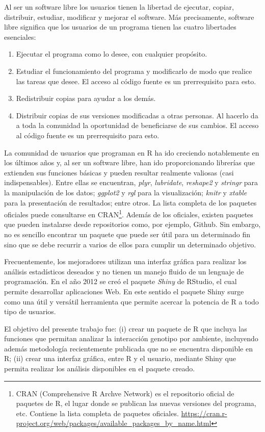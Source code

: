 Al ser un software libre los usuarios tienen la libertad de ejecutar, copiar, distribuir, estudiar, modificar y mejorar el software. Más precisamente, software libre significa que los usuarios de un programa tienen las cuatro libertades esenciales:
\begin{enumerate}
\item Ejecutar el programa como lo desee, con cualquier propósito.
\item Estudiar el funcionamiento del programa y modificarlo de modo que realice las tareas que desee. El acceso al código fuente es un prerrequisito para esto.
\item Redistribuir copias para ayudar a los demás.
\item Distribuir copias de sus versiones modificadas a otras personas. Al hacerlo da a toda la comunidad la oportunidad de beneficiarse de sus cambios. El acceso al código fuente es un prerrequisito para esto.
\end{enumerate}

La comunidad de usuarios que programan en R ha ido creciendo notablemente en los últimos años y, al ser un software libre, han ido proporcionando librerías que extienden sus funciones básicas y pueden resultar realmente valiosas (casi indispensables). Entre ellas se encuentran, \emph{plyr}, \emph{lubridate}, \emph{reshape2} y \emph{stringr} para la manipulación de los datos; \emph{ggplot2} y \emph{rgl} para la visualización; \emph{knitr} y \emph{xtable} para la presentación de resultados; entre otros. La lista completa de los paquetes oficiales puede consultarse en CRAN\footnote{CRAN (Comprehensive R Archve Network) es el repositorio oficial de paquetes de R, el lugar donde se publican las nuevas versiones del programa, etc. Contiene la lista completa de paquetes oficiales. \url{https://cran.r-project.org/web/packages/available_packages_by_name.html}}. Además de los oficiales, existen paquetes que pueden instalarse desde repositorios como, por ejemplo, Github. Sin embargo, no es sencillo encontrar un paquete que puede ser útil para un determinado fin sino que se debe recurrir a varios de ellos para cumplir un determinado objetivo. 

Frecuentemente, los mejoradores utilizan una interfaz gráfica para realizar los análisis estadísticos deseados y no tienen un manejo fluido de un lenguaje de programación. En el año 2012 se creó el paquete \emph{Shiny} de RStudio, el cual permite desarrollar aplicaciones Web. En este sentido el paquete Shiny surge como una útil y versátil herramienta que permite acercar la potencia de R a todo tipo de usuarios.

El objetivo del presente trabajo fue: (i) crear un paquete de R que incluya las funciones que permitan analizar la interacción genotipo por ambiente, incluyendo además metodología recientemente publicada que no se encuentra disponible en R; (ii) crear una interfaz gráfica, entre R y el usuario, mediante Shiny que permita realizar los análisis disponibles en el paquete creado.



